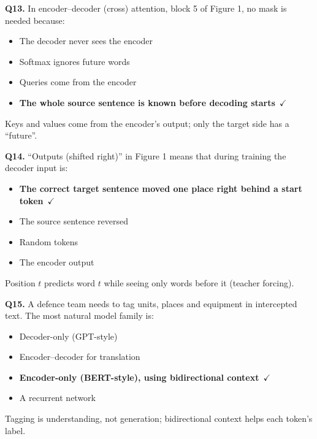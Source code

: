 \documentclass[11pt]{article}
\begin{document}
{\noindent\textbf{Q13.} In encoder--decoder (cross) attention, block 5 of Figure 1, no mask is needed because:\begin{itemize}[leftmargin=2.2em,itemsep=0pt,topsep=1pt]\item[A.] The decoder never sees the encoder\item[B.] Softmax ignores future words\item[C.] Queries come from the encoder\item[\textbf{D.}] \textbf{The whole source sentence is known before decoding starts}~{\color{GrnN}$\checkmark$}\end{itemize} Keys and values come from the encoder's output; only the target side has a ``future''.\par\medskip

\noindent\textbf{Q14.} ``Outputs (shifted right)'' in Figure 1 means that during training the decoder input is:\begin{itemize}[leftmargin=2.2em,itemsep=0pt,topsep=1pt]\item[\textbf{A.}] \textbf{The correct target sentence moved one place right behind a start token}~{\color{GrnN}$\checkmark$}\item[B.] The source sentence reversed\item[C.] Random tokens\item[D.] The encoder output\end{itemize} Position $t$ predicts word $t$ while seeing only words before it (teacher forcing).\par\medskip

\noindent\textbf{Q15.} A defence team needs to tag units, places and equipment in intercepted text. The most natural model family is:\begin{itemize}[leftmargin=2.2em,itemsep=0pt,topsep=1pt]\item[A.] Decoder-only (GPT-style)\item[B.] Encoder--decoder for translation\item[\textbf{C.}] \textbf{Encoder-only (BERT-style), using bidirectional context}~{\color{GrnN}$\checkmark$}\item[D.] A recurrent network\end{itemize} Tagging is understanding, not generation; bidirectional context helps each token's label.\par\medskip

}
\end{document}
